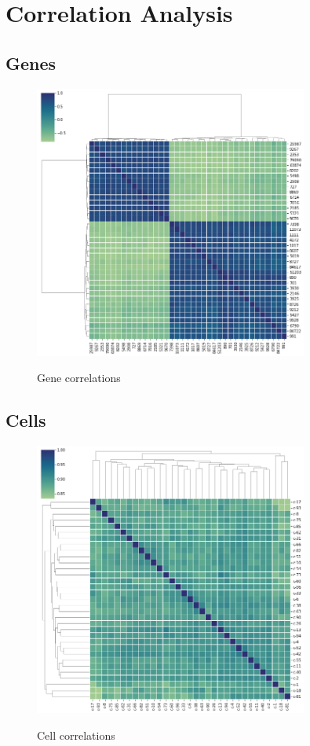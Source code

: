 \documentclass[bsc,frontabs,twoside,singlespacing,parskip,deptreport]{infthesis}     %
\let\Oldsection\section
\renewcommand{\section}{\FloatBarrier\Oldsection}
\let\Oldsubsection\subsection
\renewcommand{\subsection}{\FloatBarrier\Oldsubsection}
\begin{document}
\section{Correlation Analysis}
\subsection{Genes}
\begin{figure}[h!]
\centering
\caption{Gene correlations}
\includegraphics[height=9cm]{images/gene_corr.png}\label{gene corr}
\end{figure}
\subsection{Cells}
\begin{figure}[h!]
\centering
\caption{Cell correlations}
\includegraphics[height=9cm]{images/cell_corr.png}\label{gene corr}
\end{figure}
\end{document}
